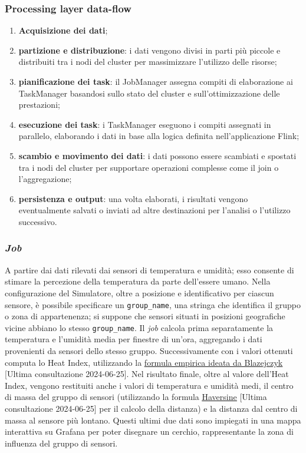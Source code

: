 \subsubsection{Processing layer data-flow}
\begin{enumerate}
	\item \textbf{Acquisizione dei dati};
	\item \textbf{partizione e distribuzione}: i dati vengono divisi in parti più piccole e distribuiti tra i nodi del cluster per massimizzare l'utilizzo delle risorse;
	\item \textbf{pianificazione dei task}: il JobManager assegna compiti di elaborazione ai TaskManager basandosi sullo stato del cluster e sull'ottimizzazione delle prestazioni;
	\item \textbf{esecuzione dei task}: i TaskManager eseguono i compiti assegnati in parallelo, elaborando i dati in base alla logica definita nell'applicazione Flink;
	\item \textbf{scambio e movimento dei dati}: i dati possono essere scambiati e spostati tra i nodi del cluster per supportare operazioni complesse come il join o l'aggregazione;
	\item \textbf{persistenza e output}: una volta elaborati, i risultati vengono eventualmente salvati o inviati ad altre destinazioni per l'analisi o l'utilizzo successivo.
\end{enumerate}

\subsubsection{\textit{Job}}

A partire dai dati rilevati dai sensori di temperatura e umidità; esso consente di stimare la percezione della temperatura da parte dell'essere umano.
Nella configurazione del Simulatore, oltre a posizione e identificativo per ciascun sensore, è possibile specificare un \texttt{group\_name}, una stringa che identifica il gruppo o zona di appartenenza;
si suppone che sensori situati in posizioni geografiche vicine abbiano lo stesso \texttt{group\_name}. Il \textit{job} calcola prima separatamente
la temperatura e l'umidità media per finestre di un'ora, aggregando i dati provenienti da sensori dello stesso gruppo. Successivamente con i valori ottenuti computa lo Heat Index,
utilizzando la \underline{\href{https://www.ncbi.nlm.nih.gov/pmc/articles/PMC3801457/}{formula empirica ideata da Blazejczyk}} [Ultima consultazione 2024-06-25].
Nel risultato finale, oltre al valore dell'Heat Index, vengono restituiti anche i valori di temperatura e umidità medi, il centro di massa del gruppo di sensori
(utilizzando la formula \underline{\href{https://en.wikipedia.org/wiki/Haversine_formula}{Haversine}} [Ultima consultazione 2024-06-25] per il calcolo della distanza) e la
distanza dal centro di massa al sensore più lontano. Questi ultimi due dati sono impiegati in una mappa interattiva su Grafana per poter disegnare un cerchio, rappresentante la zona di influenza del gruppo di sensori.

